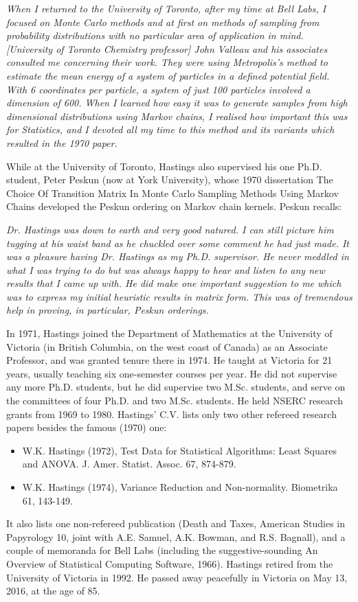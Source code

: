 \documentclass[english,graybox,envcountchap,envcountsame,sectrefs,shortlabels]{svmono}
\theoremstyle{style}
\begin{document}
\begin{subappendices}
\emph{When I returned to the University of Toronto, after my time
at Bell Labs, I focused on Monte Carlo methods and at first on methods
of sampling from probability distributions with no particular area
of application in mind. {[}University of Toronto Chemistry professor{]}
John Valleau and his associates consulted me concerning their work.
They were using Metropolis's method to estimate the mean energy of
a system of particles in a defined potential field. With 6 coordinates
per particle, a system of just 100 particles involved a dimension
of 600. When I learned how easy it was to generate samples from high
dimensional distributions using Markov chains, I realised how important
this was for Statistics, and I devoted all my time to this method
and its variants which resulted in the 1970 paper.}

While at the University of Toronto, Hastings also supervised his one
Ph.D. student, Peter Peskun (now at York University), whose 1970 dissertation
\textquotedbl The Choice Of Transition Matrix In Monte Carlo Sampling
Methods Using Markov Chains\textquotedbl{} developed the Peskun ordering
on Markov chain kernels. Peskun recalls:

\emph{Dr. Hastings was down to earth and very good natured. I can
still picture him tugging at his waist band as he chuckled over some
comment he had just made. It was a pleasure having Dr. Hastings as
my Ph.D. supervisor. He never meddled in what I was trying to do but
was always happy to hear and listen to any new results that I came
up with. He did make one important suggestion to me which was to express
my initial heuristic results in matrix form. This was of tremendous
help in proving, in particular, Peskun orderings. }

In 1971, Hastings joined the Department of Mathematics at the University
of Victoria (in British Columbia, on the west coast of Canada) as
an Associate Professor, and was granted tenure there in 1974. He taught
at Victoria for 21 years, usually teaching six one-semester courses
per year. He did not supervise any more Ph.D. students, but he did
supervise two M.Sc. students, and serve on the committees of four
Ph.D. and two M.Sc. students. He held NSERC research grants from 1969
to 1980. Hastings' C.V. lists only two other refereed research papers
besides the famous (1970) one:
\begin{itemize}
\item W.K. Hastings (1972), Test Data for Statistical Algorithms: Least
Squares and ANOVA. J. Amer. Statist. Assoc. 67, 874-879.
\item W.K. Hastings (1974), Variance Reduction and Non-normality. Biometrika
61, 143-149.
\end{itemize}
It also lists one non-refereed publication (\textquotedbl Death and
Taxes\textquotedbl , American Studies in Papyrology 10, joint with
A.E. Samuel, A.K. Bowman, and R.S. Bagnall), and a couple of memoranda
for Bell Labs (including the suggestive-sounding \textquotedbl An
Overview of Statistical Computing Software\textquotedbl , 1966).
Hastings retired from the University of Victoria in 1992. He passed
away peacefully in Victoria on May 13, 2016, at the age of 85.


\end{subappendices}
\end{document}
